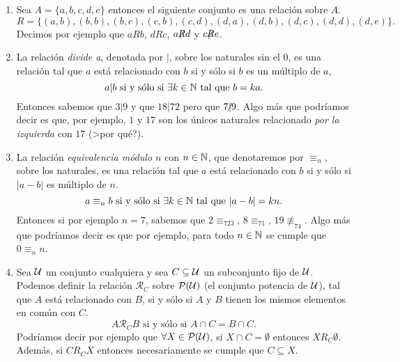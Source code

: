 \begin{ejemplo}
\begin{enumerate}
  \itemsep 0pt
  \item Sea $A=\{a,b,c,d,e\}$ entonces el siguiente conjunto es una relación sobre $A$.
  \[
  R=\{(a,b),(b,b),(b,c),(c,b),(c,d),(d,a),(d,b),(d,c),(d,d),(d,e)\}.
  \]
  Decimos por ejemplo que $aRb$, $dRc$, $a\hspace*{-0.3em}\not\hspace*{-0.3em}Rd$ y $c\hspace*{-0.3em}\not\hspace*{-0.3em}Re$.
  \item
	La relación \emph{divide a}, denotada por $|$, sobre los naturales sin el $0$, es una relación tal que $a$ está relacionado con $b$ si y sólo si $b$ es un múltiplo de $a$,
	\[
	a|b\text{ si y sólo si }\exists k\in\mathbb{N}\text{ tal que }b=ka.
	\]
	Entonces sabemos que $3|9$ y que $18|72$ pero que $7\hspace*{-0.5em}\not |9$.
	Algo más que podríamos decir es que, por ejemplo, $1$ y $17$ son los únicos naturales relacionado \emph{por la izquierda} con $17$ (>por qué?).
	
	\item
	La relación \emph{equivalencia módulo $n$} con $n\in\mathbb{N}$, que denotaremos por $\equiv_n$, sobre los naturales, es una relación tal que $a$ está relacionado con $b$ si y sólo si $|a-b|$ es múltiplo de $n$.
	\[
	a\equiv_nb\text{ si y sólo si }\exists k\in\mathbb{N}\text{ tal que }|a-b|=kn.
	\]
	Entonces si por ejemplo $n=7$, sabemos que $2\equiv_723$, $8\equiv_71$, $19\not\equiv_74$.
	Algo más que podríamos decir es que por ejemplo, para todo $n\in\mathbb{N}$ se cumple que $0\equiv_nn$.
	
	\item
	Sea $\mathcal{U}$ un conjunto cualquiera y sea $C\subseteq\mathcal{U}$ un subconjunto fijo de $\mathcal{U}$.
	Podemos definir la relación $\mathcal R_C$ sobre $\mathcal{P}(\mathcal{U})$ (el conjunto potencia de $\mathcal{U}$), tal que $A$ está relacionado con $B$, si y sólo si $A$ y $B$ tienen los mismos elementos en común con $C$.
	\[
	A\mathcal R_CB\text{ si y sólo si }A\cap C=B\cap C.
	\]
	Podríamos decir por ejemplo que $\forall X\in\mathcal{P}(\mathcal{U})$, si $X\cap C=\emptyset$ entonces $XR_C\emptyset$.
	Además, si $CR_CX$ entonces necesariamente se cumple que $C\subseteq X$.
\end{enumerate}
\end{ejemplo}

